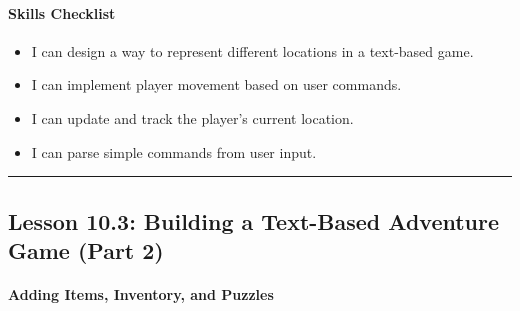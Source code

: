 \documentclass[
  justified,
  openright,
]{tufte-book}
\let\subsubsection\paragraph
\let\paragraph\paragraph
\let\subsubsection\paragraph
\let\paragraph\paragraph
\providecommand{\tightlist}{%
  \setlength{\itemsep}{0pt}\setlength{\parskip}{0pt}}
\begin{document}
\subsubsection{Skills Checklist}\label{skills-checklist-48}

\begin{itemize}
\tightlist
\item[$\square$]
  I can design a way to represent different locations in a text-based
  game.
\item[$\square$]
  I can implement player movement based on user commands.
\item[$\square$]
  I can update and track the player's current location.
\item[$\square$]
  I can parse simple commands from user input.
\end{itemize}

\begin{center}\rule{0.5\linewidth}{0.5pt}\end{center}

\subsection{Lesson 10.3: Building a Text-Based Adventure Game (Part
2)}\label{lesson-10.3-building-a-text-based-adventure-game-part-2}

\subsubsection{Adding Items, Inventory, and
Puzzles}\label{adding-items-inventory-and-puzzles}
\end{document}
